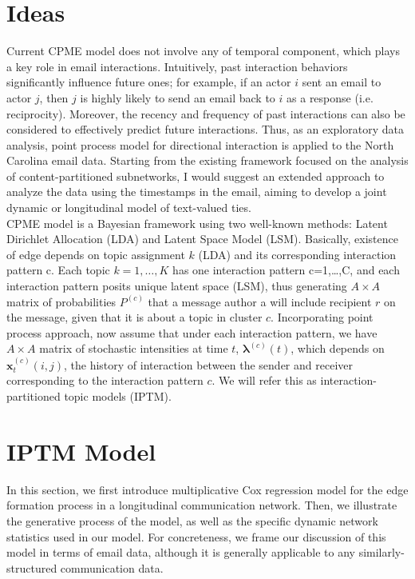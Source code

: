\documentclass[a4paper]{article}
\begin{document}
\section{Ideas}
Current CPME model does not involve any of temporal component, which plays a key role in email interactions. Intuitively, past interaction behaviors significantly influence future ones; for example, if an actor $i$ sent an email to actor $j$, then $j$ is highly likely to send an email back to $i$ as a response (i.e. reciprocity). Moreover, the recency and frequency of past interactions can also be considered to effectively predict future interactions. Thus, as an exploratory data analysis, point process model for directional interaction is applied to the North Carolina email data. Starting from the existing framework focused on the analysis of content-partitioned subnetworks, I would suggest an extended approach to analyze the data using the timestamps in the email, aiming to develop a joint dynamic or longitudinal model of text-valued ties.\\ \newline
 CPME model is a Bayesian framework using two well-known methods: Latent Dirichlet Allocation (LDA) and Latent Space Model (LSM). Basically, existence of edge depends on topic assignment $k$ (LDA) and its corresponding interaction pattern c. Each topic $k=1,…,K$ has one interaction pattern c=1,…,C, and each interaction pattern posits unique latent space (LSM), thus generating $A\times A$ matrix of probabilities $P^{(c)}$ that a message author
a will include recipient $r$ on the message, given that it is about
a topic in cluster $c$.  Incorporating point process approach, now assume that under each interaction pattern, we have $A\times A$ matrix of stochastic intensities at time $t$, $\boldsymbol{\lambda}^{(c)}(t)$, which depends on $\boldsymbol{x}^{(c)}_t(i, j)$, the history of interaction between the sender and receiver corresponding to the interaction pattern $c$. We will refer this as  interaction-partitioned topic models (IPTM). 
\section{IPTM Model}
In this section, we first introduce multiplicative Cox regression model for the edge formation process in a longitudinal communication network. Then, we illustrate the generative process of the model, as well as the specific dynamic network statistics used in our model. For concreteness, we frame our discussion of this model in terms of email data, although it is generally applicable to any similarly-structured communication data.
\end{document}
